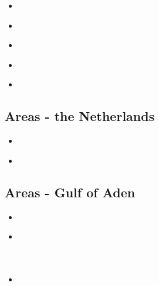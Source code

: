 \begin{scriptsize}
\begin{itemize}
\item[\nineteenninetyeight] 
\textcite{buwg98} \\
\item[\twothousandseven] 
\textcite{shpy07} \\
\item[\twothousandnine] 
\textcite{rohu09} \\
\item[\twothousandfourteen] 
\textcite{fabm14} \\
\item[\twothousandfifteen] 
\textcite{vami15} \\
\end{itemize}
\end{scriptsize}

\subsection{Areas - the Netherlands}

\begin{scriptsize}
\begin{itemize}
\item[\twothousandtwo]  
\textcite{crdv02} \\
\item[\twothousandtwenty]  
\textcite{besb20} \\
\end{itemize}
\end{scriptsize}

\subsection{Areas - Gulf of Aden}

\begin{scriptsize}
\begin{itemize}
\item[\twothousandthree] 
\textcite{hukm03} \\
\item[\twothousandthirteen] 
\textcite{beha13} \\
\textcite{brau13} \\
\textcite{wabd13} \\
\item[\twothousandtwenty] 
\textcite{duhm20} \\
\end{itemize}
\end{scriptsize}

